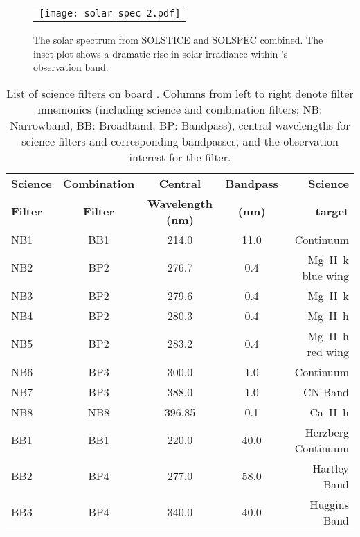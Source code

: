 \begin{figure}
    \begin{center}
    \begin{tabular}{c}
    \texttt{[image: solar\_spec\_2.pdf]}
    \end{tabular}
    \end{center}
\caption{The solar spectrum from SOLSTICE and SOLSPEC combined. The inset plot shows a dramatic rise in solar irradiance within \suit's observation band.} 
\label{fig:sun_spec} 
\end{figure} 


\begin{table*}[ht!]
\begin{center}
\begin{tabular}{||l|c|c|c|r||}
\hline
\textbf{Science}  &	\textbf{Combination} &	\textbf{Central} & \textbf{Bandpass} &\textbf{Science} \\
\textbf{Filter}	&	\textbf{Filter}     &	\textbf{Wavelength  (nm)}	&		\textbf{(nm)	}	   	&\textbf{target}		\\
\hline
NB1     & BB1 		& 214.0 		    & 11.0 		& Continuum\\
NB2 	& BP2		& 276.7				& 0.4 		& Mg~\rm{II}~k blue wing \\
NB3 	& BP2		& 279.6 			& 0.4 		& Mg~\rm{II}~k\\
NB4 	& BP2		& 280.3				& 0.4 		& Mg~\rm{II}~h\\
NB5		& BP2		& 283.2				& 0.4 		& Mg~\rm{II}~h red wing\\
NB6 	& BP3		& 300.0 			&1.0 		& Continuum\\
NB7 	& BP3		& 388.0				&1.0 		& CN Band\\
NB8		& NB8		& 396.85 			& 0.1 		& Ca~\rm{II}~h\\
BB1 	& BB1		& 220.0				& 40.0		& Herzberg Continuum \\
BB2 	& BP4		& 277.0 			& 58.0       & Hartley Band\\
BB3 	& BP4		& 340.0				& 40.0        & Huggins Band\\
\hline
\end{tabular}
\end{center}
\caption{List of science filters on board \suit. Columns from left to right denote filter mnemonics (including science and combination filters; NB: Narrowband, BB: Broadband, BP: Bandpass), central wavelengths for science filters and corresponding bandpasses, and the observation interest for the filter.} 
\label{tab:science_filters}
\end{table*}






